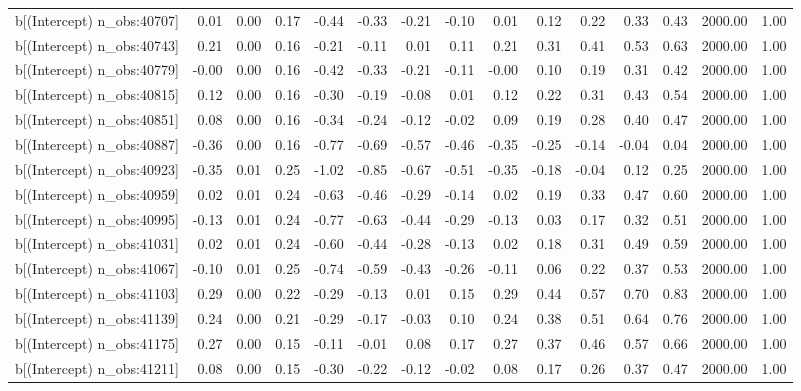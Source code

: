 \begin{table}[ht]
\begin{tabular}{rrrrrrrrrrrrrrr}
  b[(Intercept) n\_obs:40707] & 0.01 & 0.00 & 0.17 & -0.44 & -0.33 & -0.21 & -0.10 & 0.01 & 0.12 & 0.22 & 0.33 & 0.43 & 2000.00 & 1.00 \\ 
  b[(Intercept) n\_obs:40743] & 0.21 & 0.00 & 0.16 & -0.21 & -0.11 & 0.01 & 0.11 & 0.21 & 0.31 & 0.41 & 0.53 & 0.63 & 2000.00 & 1.00 \\ 
  b[(Intercept) n\_obs:40779] & -0.00 & 0.00 & 0.16 & -0.42 & -0.33 & -0.21 & -0.11 & -0.00 & 0.10 & 0.19 & 0.31 & 0.42 & 2000.00 & 1.00 \\ 
  b[(Intercept) n\_obs:40815] & 0.12 & 0.00 & 0.16 & -0.30 & -0.19 & -0.08 & 0.01 & 0.12 & 0.22 & 0.31 & 0.43 & 0.54 & 2000.00 & 1.00 \\ 
  b[(Intercept) n\_obs:40851] & 0.08 & 0.00 & 0.16 & -0.34 & -0.24 & -0.12 & -0.02 & 0.09 & 0.19 & 0.28 & 0.40 & 0.47 & 2000.00 & 1.00 \\ 
  b[(Intercept) n\_obs:40887] & -0.36 & 0.00 & 0.16 & -0.77 & -0.69 & -0.57 & -0.46 & -0.35 & -0.25 & -0.14 & -0.04 & 0.04 & 2000.00 & 1.00 \\ 
  b[(Intercept) n\_obs:40923] & -0.35 & 0.01 & 0.25 & -1.02 & -0.85 & -0.67 & -0.51 & -0.35 & -0.18 & -0.04 & 0.12 & 0.25 & 2000.00 & 1.00 \\ 
  b[(Intercept) n\_obs:40959] & 0.02 & 0.01 & 0.24 & -0.63 & -0.46 & -0.29 & -0.14 & 0.02 & 0.19 & 0.33 & 0.47 & 0.60 & 2000.00 & 1.00 \\ 
  b[(Intercept) n\_obs:40995] & -0.13 & 0.01 & 0.24 & -0.77 & -0.63 & -0.44 & -0.29 & -0.13 & 0.03 & 0.17 & 0.32 & 0.51 & 2000.00 & 1.00 \\ 
  b[(Intercept) n\_obs:41031] & 0.02 & 0.01 & 0.24 & -0.60 & -0.44 & -0.28 & -0.13 & 0.02 & 0.18 & 0.31 & 0.49 & 0.59 & 2000.00 & 1.00 \\ 
  b[(Intercept) n\_obs:41067] & -0.10 & 0.01 & 0.25 & -0.74 & -0.59 & -0.43 & -0.26 & -0.11 & 0.06 & 0.22 & 0.37 & 0.53 & 2000.00 & 1.00 \\ 
  b[(Intercept) n\_obs:41103] & 0.29 & 0.00 & 0.22 & -0.29 & -0.13 & 0.01 & 0.15 & 0.29 & 0.44 & 0.57 & 0.70 & 0.83 & 2000.00 & 1.00 \\ 
  b[(Intercept) n\_obs:41139] & 0.24 & 0.00 & 0.21 & -0.29 & -0.17 & -0.03 & 0.10 & 0.24 & 0.38 & 0.51 & 0.64 & 0.76 & 2000.00 & 1.00 \\ 
  b[(Intercept) n\_obs:41175] & 0.27 & 0.00 & 0.15 & -0.11 & -0.01 & 0.08 & 0.17 & 0.27 & 0.37 & 0.46 & 0.57 & 0.66 & 2000.00 & 1.00 \\ 
  b[(Intercept) n\_obs:41211] & 0.08 & 0.00 & 0.15 & -0.30 & -0.22 & -0.12 & -0.02 & 0.08 & 0.17 & 0.26 & 0.37 & 0.47 & 2000.00 & 1.00 \\ 

\end{tabular}
\end{table}
